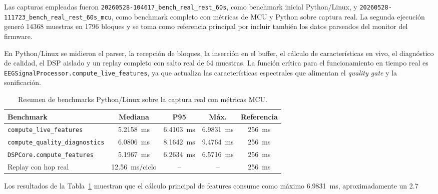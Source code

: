 \documentclass[../main.tex]{subfiles}
\begin{document}
Las capturas empleadas fueron \texttt{20260528-104617\_bench\_real\_rest\_60s}, como benchmark inicial Python/Linux, y \texttt{20260528-111723\_bench\_real\_rest\_60s\_mcu}, como benchmark completo con métricas de MCU y Python sobre captura real. La segunda ejecución generó 14368 muestras en 1796 bloques y se toma como referencia principal por incluir también los datos parseados del monitor del firmware.

En Python/Linux se midieron el parser, la recepción de bloques, la inserción en el buffer, el cálculo de características en vivo, el diagnóstico de calidad, el DSP aislado y un replay completo con salto real de 64 muestras. La función crítica para el funcionamiento en tiempo real es \texttt{EEGSignalProcessor.compute\_live\_features}, ya que actualiza las características espectrales que alimentan el \textit{quality gate} y la sonificación.

\begin{table}[htbp]
\centering
\caption{Resumen de benchmarks Python/Linux sobre la captura real con métricas MCU.}
\label{tab:validacion_bench_python}
\begin{tabular}{p{} c c c c}
\hline
\textbf{Benchmark} & \textbf{Mediana} & \textbf{P95} & \textbf{Máx.} & \textbf{Referencia} \\
\hline
\texttt{compute\_live\_features} & \SI{5.2158}{\milli\second} & \SI{6.4103}{\milli\second} & \SI{6.9831}{\milli\second} & \SI{256}{\milli\second} \\
\texttt{compute\_quality\_diagnostics} & \SI{6.0806}{\milli\second} & \SI{8.1642}{\milli\second} & \SI{9.4764}{\milli\second} & \SI{256}{\milli\second} \\
\texttt{DSPCore.compute\_features} & \SI{5.1967}{\milli\second} & \SI{6.2634}{\milli\second} & \SI{6.5716}{\milli\second} & \SI{256}{\milli\second} \\
Replay con hop real & \SI{12.56}{\milli\second/ciclo} & -- & -- & \SI{256}{\milli\second} \\
\hline
\end{tabular}
\end{table}

Los resultados de la Tabla~\ref{tab:validacion_bench_python} muestran que el cálculo principal de features consume como máximo \SI{6.9831}{\milli\second}, aproximadamente un 2.7%
\end{document}
